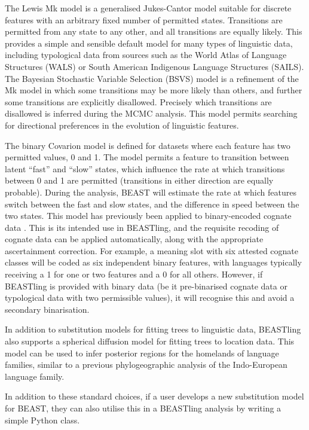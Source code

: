 \documentclass[twocolumn,10pt]{scrartcl}
\begin{document}
The Lewis Mk model\cite{Lewis2001} is a generalised Jukes-Cantor model suitable for discrete features with an arbitrary fixed number of permitted states.  Transitions are permitted from any state to any other, and all transitions are equally likely.  This provides a simple and sensible default model for many types of linguistic data, including typological data from sources such as the World Atlas of Language Structures\cite{Dryer2013} (WALS) or South American Indigenous Language Structures\cite{Muysken2014} (SAILS).  The Bayesian Stochastic Variable Selection (BSVS) model is a refinement of the Mk model in which some transitions may be more likely than others, and further some transitions are explicitly disallowed.  Precisely which transitions are disallowed is inferred during the MCMC analysis.  This model permits searching for directional preferences in the evolution of linguistic features.

The binary Covarion model\cite{Penny2001} is defined for datasets where each feature has two permitted values, 0 and 1.  The model permits a feature to transition between latent ``fast'' and ``slow'' states, which influence the rate at which transitions between 0 and 1 are permitted (transitions in either direction are equally probable).  During the analysis, BEAST will estimate the rate at which features switch between the fast and slow states, and the difference in speed between the two states.  This model has previously been applied to binary-encoded cognate data \cite{Gray2009,Bouckaert2012}.  This is its intended use in BEASTling, and the requisite recoding of cognate data can be applied automatically, along with the appropriate ascertainment correction.  For example, a meaning slot with six attested cognate classes will be coded as six independent binary features, with languages typically receiving a 1 for one or two features and a 0 for all others.  However, if BEASTling is provided with binary data (be it pre-binarised cognate data or typological data with two permissible values), it will recognise this and avoid a secondary binarisation.

In addition to substitution models for fitting trees to linguistic data, BEASTling also supports a spherical diffusion model\cite{Bouckaert2016} for fitting trees to location data.  This model can be used to infer posterior regions for the homelands of language families, similar to a previous phylogeographic analysis of the Indo-European language family\cite{Bouckaert2012}.

In addition to these standard choices, if a user develops a new substitution model for BEAST, they can also utilise this in a BEASTling analysis by writing a simple Python class.
\end{document}
